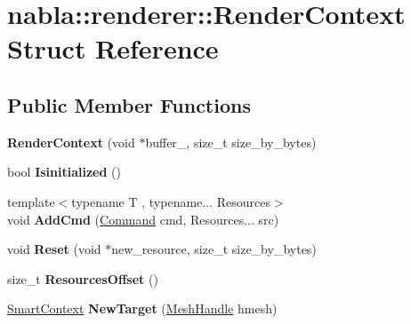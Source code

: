 \hypertarget{structnabla_1_1renderer_1_1_render_context}{}\section{nabla\+::renderer\+::Render\+Context Struct Reference}
\label{structnabla_1_1renderer_1_1_render_context}
\subsection*{Public Member Functions}
\begin{DoxyCompactItemize}
\item 
\mbox{\label{structnabla_1_1renderer_1_1_render_context_a1c795d361b8c37a1562bbd3fcd6e4799}} 
{\bfseries Render\+Context} (void $\ast$buffer\+\_\+, size\+\_\+t size\+\_\+by\+\_\+bytes)
\item 
\mbox{\label{structnabla_1_1renderer_1_1_render_context_a26ace0789685f75a7ce1ad238db2527a}} 
bool {\bfseries Isinitialized} ()
\item 
\mbox{\label{structnabla_1_1renderer_1_1_render_context_a48448254fbc4f314be6fc4a9378d823a}} 
{\footnotesize template$<$typename T , typename... Resources$>$ }\\void {\bfseries Add\+Cmd} (\mbox{\hyperlink{structnabla_1_1renderer_1_1_command}{Command}} cmd, Resources... src)
\item 
\mbox{\label{structnabla_1_1renderer_1_1_render_context_ae8b846b65f2929193a4215508745502a}} 
void {\bfseries Reset} (void $\ast$new\+\_\+resource, size\+\_\+t size\+\_\+by\+\_\+bytes)
\item 
\mbox{\label{structnabla_1_1renderer_1_1_render_context_a3257f257313a859cc7e3c7d715079d9d}} 
size\+\_\+t {\bfseries Resources\+Offset} ()
\item 
\mbox{\label{structnabla_1_1renderer_1_1_render_context_a162bdd6549e67b41aa01a840051846ad}} 
\mbox{\hyperlink{classnabla_1_1renderer_1_1_smart_context}{Smart\+Context}} {\bfseries New\+Target} (\mbox{\hyperlink{classnabla_1_1renderer_1_1_handle}{Mesh\+Handle}} hmesh)

\end{DoxyCompactItemize}
